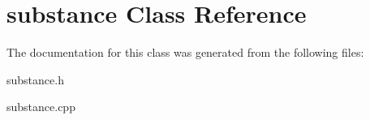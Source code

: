 \hypertarget{classsubstance}{\section{substance Class Reference}
\label{d3/df8/classsubstance}
}


The documentation for this class was generated from the following files\-:\begin{DoxyCompactItemize}
\item 
substance.\-h\item 
substance.\-cpp\end{DoxyCompactItemize}
